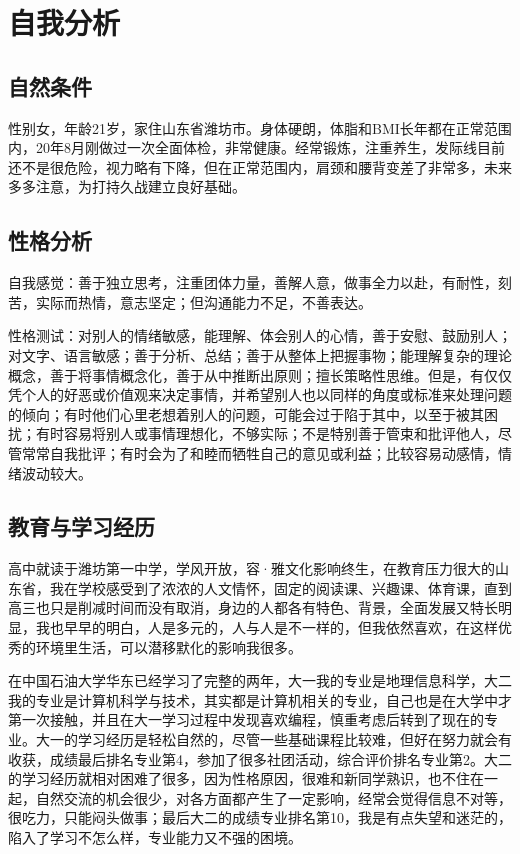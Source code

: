 \documentclass{article}
\begin{document}
\thispagestyle{empty}
\newpage
\setcounter{page}{1}
\section{自我分析}
	\par
	\par
\subsection{自然条件}
性别女，年龄21岁，家住山东省潍坊市。身体硬朗，体脂和BMI长年都在正常范围内，20年8月刚做过一次全面体检，非常健康。经常锻炼，注重养生，发际线目前还不是很危险，视力略有下降，但在正常范围内，肩颈和腰背变差了非常多，未来多多注意，为打持久战建立良好基础。\par
\subsection{性格分析}
自我感觉：善于独立思考，注重团体力量，善解人意，做事全力以赴，有耐性，刻苦，实际而热情，意志坚定；但沟通能力不足，不善表达。\par
性格测试：对别人的情绪敏感，能理解、体会别人的心情，善于安慰、鼓励别人；对文字、语言敏感；善于分析、总结；善于从整体上把握事物；能理解复杂的理论概念，善于将事情概念化，善于从中推断出原则；擅长策略性思维。但是，有仅仅凭个人的好恶或价值观来决定事情，并希望别人也以同样的角度或标准来处理问题的倾向；有时他们心里老想着别人的问题，可能会过于陷于其中，以至于被其困扰；有时容易将别人或事情理想化，不够实际；不是特别善于管束和批评他人，尽管常常自我批评；有时会为了和睦而牺牲自己的意见或利益；比较容易动感情，情绪波动较大。
\par
\subsection{教育与学习经历}
高中就读于潍坊第一中学，学风开放，容·雅文化影响终生，在教育压力很大的山东省，我在学校感受到了浓浓的人文情怀，固定的阅读课、兴趣课、体育课，直到高三也只是削减时间而没有取消，身边的人都各有特色、背景，全面发展又特长明显，我也早早的明白，人是多元的，人与人是不一样的，但我依然喜欢，在这样优秀的环境里生活，可以潜移默化的影响我很多。\par
在中国石油大学华东已经学习了完整的两年，大一我的专业是地理信息科学，大二我的专业是计算机科学与技术，其实都是计算机相关的专业，自己也是在大学中才第一次接触，并且在大一学习过程中发现喜欢编程，慎重考虑后转到了现在的专业。大一的学习经历是轻松自然的，尽管一些基础课程比较难，但好在努力就会有收获，成绩最后排名专业第4，参加了很多社团活动，综合评价排名专业第2。大二的学习经历就相对困难了很多，因为性格原因，很难和新同学熟识，也不住在一起，自然交流的机会很少，对各方面都产生了一定影响，经常会觉得信息不对等，很吃力，只能闷头做事；最后大二的成绩专业排名第10，我是有点失望和迷茫的，陷入了学习不怎么样，专业能力又不强的困境。
\par
\end{document}
